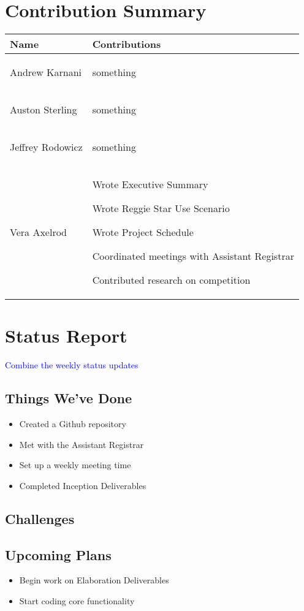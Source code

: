 \documentclass[11pt]{article}
\newenvironment{packed_itemize}{
\begin{itemize}
  \setlength{\itemsep}{1pt}
  \setlength{\parskip}{0pt}
  \setlength{\parsep}{0pt}
}{\end{itemize}}
\begin{document}
\section{Contribution Summary} %
\begin{tabular}{|m{1.4in}|m{4in}|}
\hline
\textbf{\large Name}     & \textbf{\large Contributions} \\
\hline\hline
 Andrew Karnani
	& 
	 \begin{packed_itemize} 
		\item something
	\end{packed_itemize}
\\
\hline
 Auston Sterling
	& 
	 \begin{packed_itemize} 
		\item something
	\end{packed_itemize}
\\
\hline
Jeffrey Rodowicz
	& 
	 \begin{packed_itemize} 
		\item something
	\end{packed_itemize}
\\
\hline
Vera Axelrod
	& 
	 \begin{packed_itemize} 
		\item Wrote Executive Summary 
		\item Wrote Reggie Star Use Scenario
		\item Wrote Project Schedule
		\item Coordinated meetings with Assistant Registrar
		\item Contributed research on competition
	\end{packed_itemize}
\\
\hline
\end{tabular}


\section{Status Report} %
\textcolor{blue}{Combine the weekly status updates}
\subsection{Things We've Done}
\begin{itemize}
\item Created a Github repository
\item Met with the Assistant Registrar
\item Set up a weekly meeting time
\item Completed Inception Deliverables
\end{itemize}

\subsection{Challenges} %

\subsection{Upcoming Plans}
\begin{itemize}
\item Begin work on Elaboration Deliverables
\item Start coding core functionality
\end{itemize}
\end{document}
